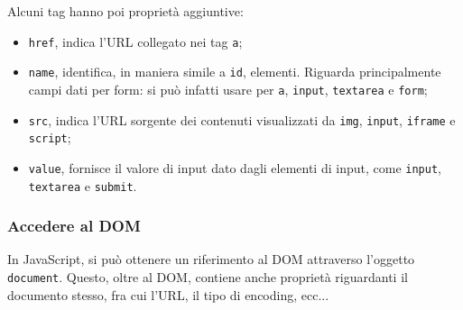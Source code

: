 \documentclass[a4paper,11pt]{article}
\begin{document}
Alcuni tag hanno poi proprietà aggiuntive:
\begin{itemize}
	\item \lstinline|href|, indica l'URL collegato nei tag \lstinline|a|;
	\item \lstinline|name|, identifica, in maniera simile a \lstinline|id|, elementi. Riguarda principalmente campi dati per form: si può infatti usare per \lstinline|a|, \lstinline|input|, \lstinline|textarea| e \lstinline|form|;
	\item \lstinline|src|, indica l'URL sorgente dei contenuti visualizzati da \lstinline|img|, \lstinline|input|, \lstinline|iframe| e \lstinline|script|;
	\item \lstinline|value|, fornisce il valore di input dato dagli elementi di input, come \lstinline|input|, \lstinline|textarea| e \lstinline|submit|.
\end{itemize}

\subsubsection{Accedere al DOM}
In JavaScript, si può ottenere un riferimento al DOM attraverso l'oggetto \lstinline|document|. 
Questo, oltre al DOM, contiene anche proprietà riguardanti il documento stesso, fra cui l'URL, il tipo di encoding, ecc...
\end{document}
